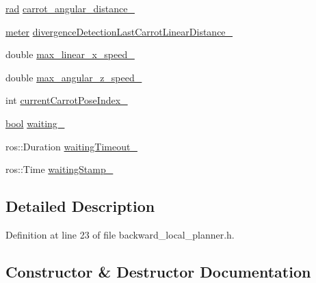 \begin{DoxyCompactItemize}
\hyperlink{backward__local__planner_8h_a640effbe91ae9b25d698a883a9e80d96}{rad} \hyperlink{classcl__move__base__z_1_1backward__local__planner_1_1BackwardLocalPlanner_a63e30befa09c4a67cf55086923b760c7}{carrot\+\_\+angular\+\_\+distance\+\_\+}
\item 
\hyperlink{backward__local__planner_8h_ab6024a26b088c11b8a5218a469ae5a57}{meter} \hyperlink{classcl__move__base__z_1_1backward__local__planner_1_1BackwardLocalPlanner_a3187b3b0c9a640133556efd056f2e736}{divergence\+Detection\+Last\+Carrot\+Linear\+Distance\+\_\+}
\item 
double \hyperlink{classcl__move__base__z_1_1backward__local__planner_1_1BackwardLocalPlanner_ae4399072e9ae9cc60d8837860dc4807b}{max\+\_\+linear\+\_\+x\+\_\+speed\+\_\+}
\item 
double \hyperlink{classcl__move__base__z_1_1backward__local__planner_1_1BackwardLocalPlanner_af7e492339ee2d1c90c00f6dd4cf95551}{max\+\_\+angular\+\_\+z\+\_\+speed\+\_\+}
\item 
int \hyperlink{classcl__move__base__z_1_1backward__local__planner_1_1BackwardLocalPlanner_a2e8f2b78bc97f27c5fa431f3af2261ed}{current\+Carrot\+Pose\+Index\+\_\+}
\item 
\hyperlink{classbool}{bool} \hyperlink{classcl__move__base__z_1_1backward__local__planner_1_1BackwardLocalPlanner_a00849266e4bdd9379c3717e8a41c303e}{waiting\+\_\+}
\item 
ros\+::\+Duration \hyperlink{classcl__move__base__z_1_1backward__local__planner_1_1BackwardLocalPlanner_a0c15da985f7f051164adb643c03a0c90}{waiting\+Timeout\+\_\+}
\item 
ros\+::\+Time \hyperlink{classcl__move__base__z_1_1backward__local__planner_1_1BackwardLocalPlanner_abe08faab5b784fcf64ac6b3f936459f1}{waiting\+Stamp\+\_\+}
\end{DoxyCompactItemize}


\subsection{Detailed Description}


Definition at line 23 of file backward\+\_\+local\+\_\+planner.\+h.



\subsection{Constructor \& Destructor Documentation}
\mbox{\label{classcl__move__base__z_1_1backward__local__planner_1_1BackwardLocalPlanner_a79e73a858b2a13c7fe10c52e08568fd6}} 
